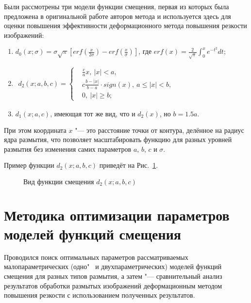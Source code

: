 Были рассмотрены три модели функции смещения, первая из которых была предложена в оригинальной работе авторов метода и используется здесь для оценки повышения эффективности деформационного метода повышения резкости изображений:
\begin{enumerate}[beginpenalty=10000]
	\item $d_0\left(x;\sigma\right)=\sigma\sqrt\pi\left[erf\left(\frac{x}{2\sigma}\right)-erf\left(\frac{x}{\sigma}\right)\right]$, где $erf{\left(x\right)}=\frac{2}{\sqrt\pi}\int_{0}^{x}{e^{-t^2}dt}$;
	\item
	$
	\begin{aligned}
		d_2\left(x;a,b,c\right)=\left\{
		\begin{aligned}
			&\frac{c}{a}x,\ \left|x\right|<a,\\
			&c\frac{b-\left|x\right|}{b-a} \cdot sign\left(x\right),\ a\le\left|x\right|<b,\\
			&0,\ \left|x\right|\geq b;
		\end{aligned}
		\right.
	\end{aligned}
	$
	\item $d_1(x;a,c)$, имеющая тот же вид, что и $d_2(x)$, но $b=1.5a$.
\end{enumerate}

При этом координата $x$ "--- это расстояние точки от контура, делённое на радиус ядра размытия, что позволяет масштабировать функцию для разных уровней размытия без изменения самих параметров $a$, $b$, $c$ и $\sigma$.

Пример функции $d_2(x;a,b,c)$ приведёт на Рис.~\ref{fig:warping-d2-example}.

\begin{figure}[ht]
	\caption{Вид функции смещения $d_2(x;a,b,c)$}
	\label{fig:warping-d2-example}
\end{figure}

\section{Методика оптимизации параметров моделей функций смещения}

Проводился поиск оптимальных параметров рассматриваемых малопараметрических (одно"~ и двухпараметрических) моделей функций смещения для разных типов размытия, а затем "--- сравнительный анализ результатов обработки размытых изображений деформационным методом повышения резкости с использованием полученных результатов.

